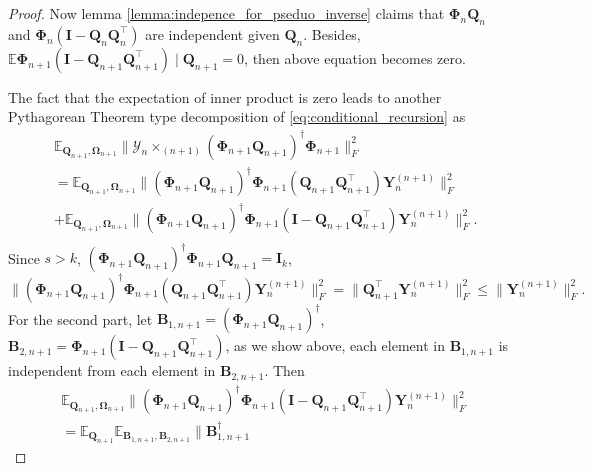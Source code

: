 \begin{lem}
\begin{proof}
Now lemma \ref{lemma:indepence_for_pseduo_inverse} claims that $\mathbf{\Phi}_n\mathbf{Q}_n$ and $\mathbf{\Phi}_n(\mathbf{I} - \mathbf{Q}_n\mathbf{Q}_n^\top)$ are independent given $\mathbf{Q}_n$. Besides, 
$\mathbb{E} \mathbf{\Phi}_{n+1}(\mathbf{I}-\mathbf{Q}_{n+1}\mathbf{Q}_{n+1}^\top )\mid \mathbf{Q}_{n+1} = 0$, then above equation becomes zero. \par 
The fact that the expectation of inner product is zero leads to another Pythagorean Theorem type decomposition of \ref{eq:conditional_recursion} as
\begin{equation}
\begin{aligned}
&\mathbb{E}_{\mathbf{Q}_{n+1}, \mathbf{\Omega}_{n+1}}  \|\mathscr{Y}_n\times_{(n+1)} (\mathbf{\Phi}_{n+1}\mathbf{Q}_{n+1})^\dag \mathbf{\Phi}_{n+1}\|_F^2\\
& = \mathbb{E}_{\mathbf{Q}_{n+1}, \mathbf{\Omega}_{n+1}} \|(\mathbf{\Phi}_{n+1}\mathbf{Q}_{n+1})^\dag \mathbf{\Phi}_{n+1}(\mathbf{Q}_{n+1}\mathbf{Q}_{n+1}^\top)\mathbf{Y}_n^{(n+1)}\|_F^2\\
&+\mathbb{E}_{\mathbf{Q}_{n+1}, \mathbf{\Omega}_{n+1}} \|(\mathbf{\Phi}_{n+1}\mathbf{Q}_{n+1})^\dag \mathbf{\Phi}_{n+1}(\mathbf{I}-\mathbf{Q}_{n+1}\mathbf{Q}_{n+1}^\top)\mathbf{Y}_n^{(n+1)}\|_F^2.\\
\end{aligned}
\end{equation}
Since $s>k$, $(\mathbf{\Phi}_{n+1}\mathbf{Q}_{n+1})^\dag \mathbf{\Phi}_{n+1}\mathbf{Q}_{n+1} = \mathbf{I}_k$, 
\begin{equation}
\|(\mathbf{\Phi}_{n+1}\mathbf{Q}_{n+1})^\dag \mathbf{\Phi}_{n+1}(\mathbf{Q}_{n+1}\mathbf{Q}_{n+1}^\top)\mathbf{Y}_n^{(n+1)}\|_F^2 = \|\mathbf{Q}_{n+1}^\top\mathbf{Y}_n^{(n+1)}\|_F^2 \le \|\mathbf{Y}_n^{(n+1)}\|_F^2.
\end{equation}
 For the second part, let $\mathbf{B}_{1,n+1} = (\mathbf{\Phi}_{n+1}\mathbf{Q}_{n+1})^\dag$, $\mathbf{B}_{2,n+1} = \mathbf{\Phi}_{n+1}(\mathbf{I}-\mathbf{Q}_{n+1}\mathbf{Q}_{n+1}^\top)$, 
 as we show above, each element in $\mathbf{B}_{1,n+1}$ is independent from each element in $\mathbf{B}_{2,n+1}$. Then 
\begin{equation}
\begin{aligned}
&\mathbb{E}_{\mathbf{Q}_{n+1}, \mathbf{\Omega}_{n+1}} \|(\mathbf{\Phi}_{n+1}\mathbf{Q}_{n+1})^\dag \mathbf{\Phi}_{n+1}(\mathbf{I}-\mathbf{Q}_{n+1}\mathbf{Q}_{n+1}^\top)\mathbf{Y}_n^{(n+1)}\|_F^2\\
& =\mathbb{E}_{\mathbf{Q}_{n+1}} \mathbb{E}_{\mathbf{B}_{1,n+1}, \mathbf{B}_{2, n+1}} \|\mathbf{B}_{1,n+1}^\dag

\end{aligned}
\end{equation}
\end{proof}
\end{lem}
